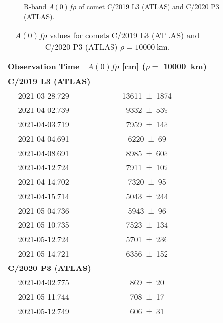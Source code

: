 \begin{figure}
    \centering

    \caption{R-band $A(0)f\rho$ of comet C/2019 L3 (ATLAS) and C/2020 P3 (ATLAS). }
    \label{fig:Afrho}
\end{figure}

\begin{table}
    \centering
    \caption{$A(0)f\rho$ values for comets C/2019 L3 (ATLAS) and C/2020 P3 (ATLAS)  $\rho = \qty{10000}{\km}$. }\label{tab:afrho}
    \begin{threeparttable}
        \begin{tabular}{cc}
            \toprule
            Observation Time & $A(0)f\rho$ [\unit{\cm}] ($\rho =$ \qty{10000}{\km}) \\
            \midrule
            \multicolumn{2}{l}{\textbf{C/2019 L3 (ATLAS)}} \\
            2021-03-28.729 & \num{13611 +- 1874} \\
            2021-04-02.739 & \num{9332 +- 539} \\
            2021-04-03.719 & \num{7959 +- 143} \\
            2021-04-04.691 & \num{6220 +- 69} \\
            2021-04-08.691 & \num{8985 +- 603} \\
            2021-04-12.724 & \num{7911 +- 102} \\
            2021-04-14.702 & \num{7320 +- 95} \\
            2021-04-15.714 & \num{5043 +- 244} \\
            2021-05-04.736 & \num{5943 +- 96} \\
            2021-05-10.735 & \num{7523 +- 134} \\
            2021-05-12.724 & \num{5701 +- 236} \\
            2021-05-14.721 & \num{6356 +- 152} \\
            \multicolumn{2}{l}{\textbf{C/2020 P3 (ATLAS)}} \\
            2021-04-02.775 & \num{869 +- 20} \\
            2021-05-11.744 & \num{708 +- 17} \\
            2021-05-12.749 & \num{606 +- 31} \\
            \bottomrule
        \end{tabular}
    \end{threeparttable}
\end{table}
